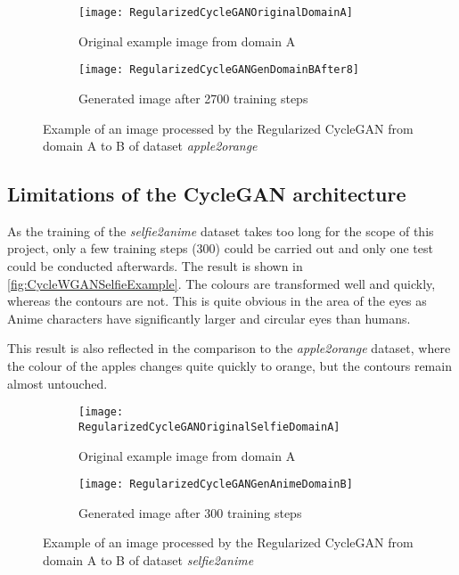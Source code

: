 \documentclass[fleqn,10pt]{SelfArx} %
\begin{document}
\begin{figure}[htb] 
	\centering 
\begin{subfigure}[b]{0.45\linewidth}
	\texttt{[image: RegularizedCycleGANOriginalDomainA]}
	\caption{Original example image from domain A}
\end{subfigure}
\hfill
\begin{subfigure}[b]{0.45\linewidth}
	\texttt{[image: RegularizedCycleGANGenDomainBAfter8]}
	\caption{Generated image after 2700 training steps}
	\end{subfigure}
\caption{Example of an image processed by the Regularized Cycle\ac{GAN} from domain A to B of dataset \textit{apple2orange}}
\label{fig:RegularizedCycleGANExample}
\end{figure}

\subsection{Limitations of the Cycle\ac{GAN} architecture}
As the training of the \textit{selfie2anime} dataset takes too long for the scope of this project, only a few training steps (300) could be carried out and only one test could be conducted afterwards. The result is shown in \autoref{fig:CycleWGANSelfieExample}. The colours are transformed well and quickly, whereas the contours are not. This  is quite obvious in the area of the eyes as Anime characters have significantly larger and circular eyes than humans.

This result is also reflected in the comparison to the \textit{apple2orange} dataset, where the colour of the apples changes quite quickly to orange, but the contours remain almost untouched.

\begin{figure}[htb] 
	\centering 
\begin{subfigure}[b]{0.45\linewidth}
	\texttt{[image: RegularizedCycleGANOriginalSelfieDomainA]}
	\caption{Original example image from domain A}
\end{subfigure}
\hfill
\begin{subfigure}[b]{0.45\linewidth}
	\texttt{[image: RegularizedCycleGANGenAnimeDomainB]}
	\caption{Generated image after 300 training steps}
	\end{subfigure}
\caption{Example of an image processed by the Regularized Cycle\ac{GAN} from domain A to B of dataset \textit{selfie2anime}}
\label{fig:CycleWGANSelfieExample}
\end{figure}
\end{document}

